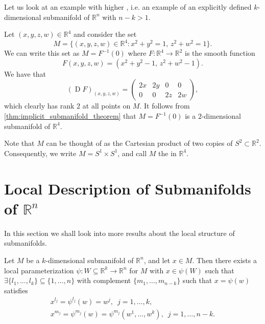 \documentclass[notoc,notitlepage]{tufte-book}
\DeclareMathOperator{\D}{D}
\begin{document}
Let us look at an example with higher , i.e. an example of
an explicitly defined $k$-dimensional submanifold of $\mathbb{R}^n$ with $n - k
> 1$.

\begin{eg}
  Let $(x, y, z, w) \in \mathbb{R}^4$ and consider the set
  \begin{equation*}
    M = \{ (x, y, z, w) \in \mathbb{R}^4 : x^2 + y^2 = 1, \, z^2 + w^2 = 1 \}.
  \end{equation*}
  We can write this set as $M = F^{-1}(0)$ where $F : \mathbb{R}^4 \to
  \mathbb{R}^2$ is the smooth function
  \begin{equation*}
    F(x, y, z, w) = (x^2 + y^2 - 1, \, z^2 + w^2 - 1).
  \end{equation*}
  We have that
  \begin{equation*}
    (\D F)_{(x, y, z, w)} = \begin{pmatrix}
      2x & 2y & 0  & 0 \\
      0  & 0  & 2z & 2w
    \end{pmatrix},
  \end{equation*}
  which clearly has rank $2$ at all points on $M$. It follows from
  \cref{thm:implicit_submanifold_theorem} that $M =
  F^{-1}(0)$ is a $2$-dimensional submanifold of $\mathbb{R}^4$.

  Note that $M$ can be thought of as the Cartesian product of two copies of $S^2
  \subset \mathbb{R}^2$. Consequently, we write $M = S^1 \times S^1$, and call
  $M$ the  in $\mathbb{R}^4$.
\end{eg}


\section{Local Description of Submanifolds of \texorpdfstring{$\mathbb{R}^n$}{Rn}}%
\label{sec:local_description_of_submanifolds_of_r_n_}

In this section we shall look into more results about the local structure of
submanifolds.

\begin{thm}\label{thm:points_on_the_parameterization}
  Let $M$ be a $k$-dimensional submanifold of $\mathbb{R}^n$, and let $x \in M$.
  Then there exists a local parameterization $\psi : W \subseteq \mathbb{R}^k \to
  \mathbb{R}^n$ for $M$ with $x \in \psi(W)$ such that $\exists \{ l_1, \ldots,
  l_k \} \subseteq \{ 1, \ldots, n \}$ with complement $\{ m_1, \ldots, m_{n -
  k} \}$ such that $x = \psi(w)$ satisfies
  \begin{gather*}
    x^{l_j} = \psi^{l_j}(w) = w^j, \enspace j = 1, \ldots, k, \\
    x^{m_j} = \psi^{m_j}(w) = \psi^{m_j} (w^1, \ldots, w^k), \enspace j = 1,
    \ldots, n - k.
  \end{gather*}
\end{thm}
\end{document}
